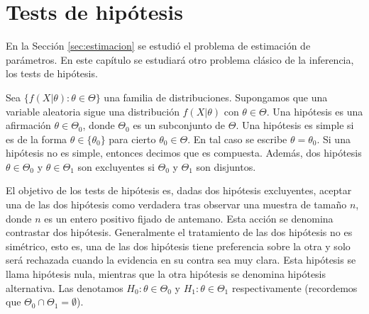 

\section{Tests de hipótesis}

    En la Sección \ref{sec:estimacion} se estudió el problema de estimación de parámetros. En este capítulo se estudiará otro problema clásico de la inferencia, los tests de hipótesis.

    \begin{definition}
        Sea $\{f(X|\theta): \theta \in \Theta\}$ una familia de distribuciones. Supongamos que una variable aleatoria sigue una distribución $f(X|\theta)$ con $\theta \in \Theta$. Una hipótesis es una afirmación $\theta \in \Theta_0$, donde $\Theta_0$ es un subconjunto de $\Theta$. Una hipótesis es simple si es de la forma  $\theta \in \{\theta_0\}$ para cierto $\theta_0 \in \Theta$. En tal caso se escribe $\theta = \theta_0$. Si una hipótesis no es simple, entonces decimos que es compuesta. Además, dos hipótesis $\theta \in \Theta_0$ y $\theta \in \Theta_1$ son excluyentes si $\Theta_0$ y $\Theta_1$ son disjuntos.
    \end{definition}

    El objetivo de los tests de hipótesis es, dadas dos hipótesis excluyentes, aceptar una de las dos hipótesis como verdadera tras observar una muestra de tamaño $n$, donde $n$ es un entero positivo fijado de antemano. Esta acción se denomina contrastar dos hipótesis. Generalmente el tratamiento de las dos hipótesis no es simétrico, esto es, una de las dos hipótesis tiene preferencia sobre la otra y solo será rechazada cuando la evidencia en su contra sea muy clara. Esta hipótesis se llama hipótesis nula, mientras que la otra hipótesis se denomina hipótesis alternativa. Las denotamos $H_0: \theta \in \Theta_0$ y $H_1: \theta \in \Theta_1$ respectivamente (recordemos que $\Theta_0 \cap \Theta_1 = \emptyset$).

